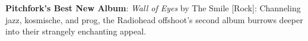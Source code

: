 \textbf{Pitchfork's Best New Album}: \textit{Wall of Eyes} by The Smile [Rock]: Channeling jazz, kosmische, and prog, the Radiohead offshoot{\textquoteright}s second album burrows deeper into their strangely enchanting appeal.